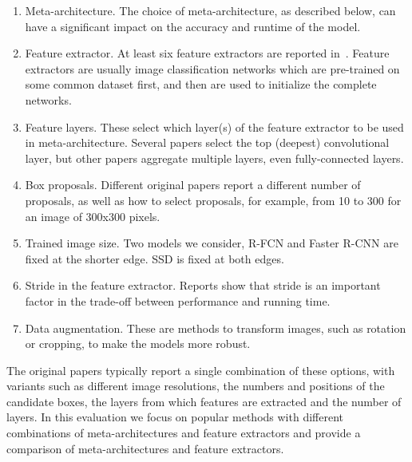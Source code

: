 \documentclass[conference]{IEEEtran}
\newcommand{\dungnote}[1]{ {\textcolor{orange} { ***dung: #1 }}}
\newcommand{\dungnote}[1]{}
\begin{document}
\begin{enumerate}
     \item Meta-architecture.  The choice of meta-architecture, as described below, can have a significant impact on the accuracy and runtime of the model.  
    \item Feature extractor.   At least six feature extractors are reported in~\cite{huang2017speed}. Feature extractors are usually image classification networks which are pre-trained on some common dataset first, and then are used to initialize the complete networks.  
    \item Feature layers.  These select which layer(s) of the feature extractor to be used in meta-architecture. Several papers select the top (deepest) convolutional layer, but other papers aggregate multiple layers, even fully-connected layers.
    \item Box proposals.  Different original papers report a different number of proposals, as well as how to select proposals, for example, from 10 to 300 for an image of 300x300 pixels.
    \item Trained image size.  Two models we consider, R-FCN and Faster R-CNN are fixed at the shorter edge. SSD is fixed at both edges.
    \item Stride in the feature extractor.  Reports show that stride is an important factor in the trade-off between performance and running time.
    \item Data augmentation.  These are methods to transform images, such as rotation or cropping,  to make the models more robust.
\end{enumerate}

The original papers typically report a single combination of these options, with variants such as different image resolutions, the numbers and positions of the candidate boxes, the layers from which features are extracted and the number of layers.  In this evaluation we focus on popular methods with different combinations of  meta-architectures and feature extractors and provide a comparison of meta-architectures and feature extractors.


\end{document}
